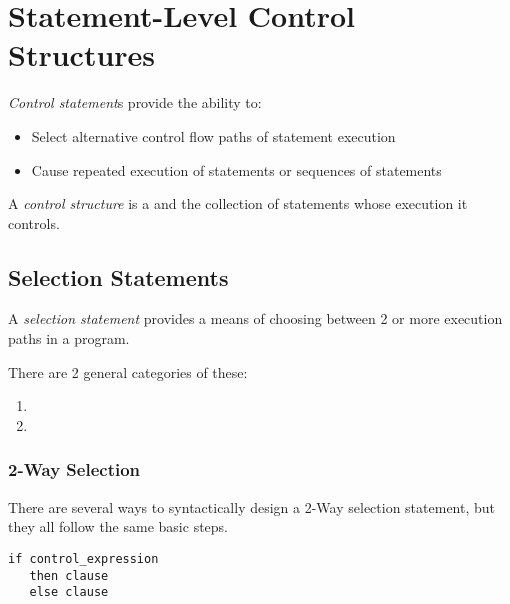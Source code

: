 \section{Statement-Level Control Structures}\label{sec:Statement_Level_Control_Structures}
\begin{definition}\label{def:Control_Statement}
  \emph{Control statement}s provide the ability to:
  \begin{itemize}[noitemsep]
  \item Select alternative control flow paths of statement execution
  \item Cause repeated execution of statements or sequences of statements
  \end{itemize}
\end{definition}

\begin{definition}\label{def:Control_Structure}
  A \emph{control structure} is a  and the collection of statements whose execution it controls.
\end{definition}

\subsection{Selection Statements}\label{subsec:Selection_Statements}
\begin{definition}\label{def:Selection_Statement}
  A \emph{selection statement} provides a means of choosing between 2 or more execution paths in a program.

  There are 2 general categories of these:
  \begin{enumerate}[noitemsep]
  \item {}
  \item {}
  \end{enumerate}
\end{definition}

\subsubsection{2-Way Selection}\label{subsubsec:2_Way_Selection}
There are several ways to syntactically design a 2-Way selection statement, but they all follow the same basic steps.
\begin{verbatim}
if control_expression
   then clause
   else clause
\end{verbatim}

